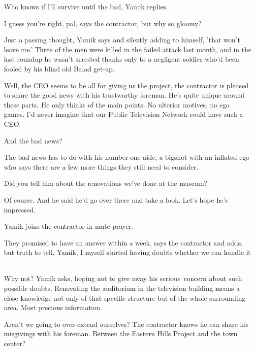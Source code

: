 \documentclass[letterpaper]{article}
\begin{document}
{\textquotedbl}Who knows if I'll survive until the bad,{\textquotedbl} Yamik replies.\textcolor{red}{\ }

{\textquotedbl}I guess you're right, pal,{\textquotedbl} says the contractor, {\textquotedbl}but why so
gloomy?{\textquotedbl} 

{\textquotedbl}Just a passing thought,{\textquotedbl} Yamik says and silently adding to himself, 'that won't leave me.'
Three of the men were killed in the failed attack last month, and in the last roundup he wasn't arrested thanks only to
a negligent soldier who'd been fooled by his blind old Balad get-up. 

{\textquotedbl}Well, the CEO seems to be all for giving us the project,{\textquotedbl} the contractor is pleased to
share the good news with his trustworthy foreman. {\textquotedbl}He's quite unique around these parts. He only thinks
of the main points. No ulterior motives, no ego games. I'd never imagine that our Public Television Network could have
such a CEO.{\textquotedbl}

{\textquotedbl}And the bad news?{\textquotedbl} 

{\textquotedbl}The bad news has to do with his number one aide, a bigshot with an inflated ego who says there are a few
more things they still need to consider.{\textquotedbl} 

{\textquotedbl}Did you tell him about the renovations we've done at the museum?{\textquotedbl} 

{\textquotedbl}Of course. And he said he'd go over there and take a look. Let's hope he's impressed.{\textquotedbl} 

Yamik joins the contractor in mute prayer. 

{\textquotedbl}They promised to have an answer within a week,{\textquotedbl} says the contractor and adds,
{\textquotedbl}but truth to tell, Yamik, I myself started having doubts whether we can handle it -{\textquotedbl} 

{\textquotedbl}Why not?{\textquotedbl} Yamik asks, hoping not to give away his serious\textcolor{red}{\ }concern about
such possible doubts. Renovating the auditorium in the television building means a close knowledge not only of that
specific structure but of the whole surrounding area. Most precious information. ~

{\textquotedbl}Aren't we going to over-extend ourselves?{\textquotedbl} The contractor knows he can share his misgivings
with his foreman. {\textquotedbl}Between the Eastern Hills Project and the town center?{\textquotedbl} 
\end{document}
